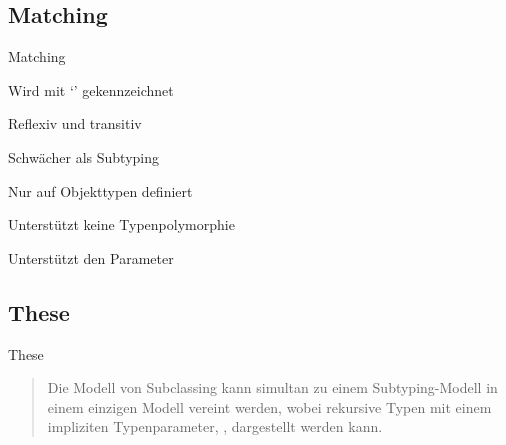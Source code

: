 \subsection{Matching}
\begin{frame}{Matching}
	\begin{bigitemize}[<+->]{3mm}
		\item Wird mit `\match' gekennzeichnet

		\item Reflexiv und transitiv

		\item Schwächer als Subtyping

		\item Nur auf Objekttypen definiert

		\item Unterstützt keine Typenpolymorphie

		\item Unterstützt den \mytype Parameter
	\end{bigitemize}
\end{frame}

\subsection{These}
\begin{frame}[c]{These}
	\begin{quote}
	Die Modell von Subclassing kann simultan zu einem Subtyping-Modell
	in einem einzigen Modell vereint werden, wobei rekursive Typen mit
	einem impliziten Typenparameter, \mytype, dargestellt werden kann.
	\end{quote}
\end{frame}
